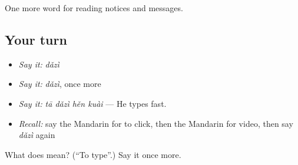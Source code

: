 \begin{grammarlens}[title={What you've built}]
One more word for reading notices and messages.
\end{grammarlens}

\subsection*{Your turn}
\begin{itemize}
\raggedright
  \item \emph{Say it:} \emph{dǎzì}
  \item \emph{Say it:} \emph{dǎzì}, once more
  \item \emph{Say it:} \emph{tā dǎzì hěn kuài} — He types fast.
  \item \emph{Recall:} say the Mandarin for to click, then the Mandarin for video, then say \emph{dǎzì} again
\end{itemize}

\begin{tcolorbox}[breakable,colback=teal!4,colframe=teal!35!black,title={Before you move on}]
What does  mean? (\textquotedblleft{}To type\textquotedblright{}.) Say it once more.
\end{tcolorbox}
